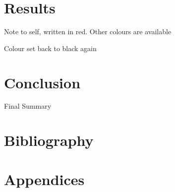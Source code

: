 \documentclass[11pt, A4]{article}
\begin{document}


\section{Results}
\color{red}Note to self, written in red.
\color{blue}Other colours are available 

\color{black} Colour set back to black again

\section{Conclusion}
Final Summary

\newpage
\section{Bibliography}
\printbibliography

\newpage
\appendix 
\section{Appendices}
\end{document}
